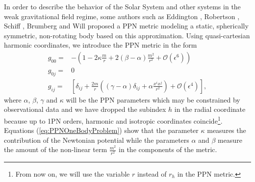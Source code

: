 In order to describe the behavior of the Solar System and other systems in the weak gravitational field regime, some authors such as Eddington \cite{Eddington1922}, Robertson \cite{Robertson1962}, Schiff \cite{Schiff1967}, Brumberg \cite{Brumberg1972, Brumberg1991} and Will\cite{Will1993} proposed a PPN metric modeling a static, spherically symmetric, non-rotating body based on this approximation.  Using quasi-cartesian harmonic coordinates, we introduce the PPN metric in the form
\begin{subequations}\label{eq:PPNOneBodyProblem}
\begin{align}
g_{00} =& -\left( 1 - 2\kappa \frac{m}{r} + 2\left( \beta - \alpha  \right)\frac{ m^2}{r^2} + \mathcal{O} ( \epsilon ^6 )  \right) \\
g_{0j} =& 0 \\
g_{ij} =& \left[ \delta_{ij} + \frac{2 m}{r} \left( (\gamma - \alpha ) \delta_{ij} + \alpha \frac{x^i x^j}{r^2} \right) + \mathcal{O} ( \epsilon ^4 )  \right] ,
\end{align}
\end{subequations}
where  $\alpha$, $\beta$, $\gamma$ and $\kappa$ will be the PPN parameters which may be constrained by observational data and we have dropped the subindex $h$ in the radial coordinate because up to 1PN orders, harmonic and isotropic coordinates coincide\footnote{From now on, we will use the variable $r$ instead of $r_h$ in the PPN metric.}. Equations (\ref{eq:PPNOneBodyProblem}) show that the parameter $\kappa$ measures the contribution of the Newtonian potential while the parameters $\alpha$ and $\beta$ measure the amount of the non-linear term $\frac{m^2}{r^2}$ in the components of the metric. 

